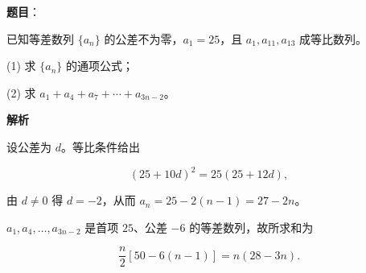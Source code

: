 \begin{answer}

\textbf{题目}：

已知等差数列 $\{a_n\}$ 的公差不为零，$a_1=25$，且 $a_1,a_{11},a_{13}$ 成等比数列。

(1) 求 $\{a_n\}$ 的通项公式；

(2) 求 $a_1+a_4+a_7+\cdots+a_{3n-2}$。

\textbf{解析}


设公差为 $d$。等比条件给出

\nopagebreak[4]
\[(25+10d)^2=25(25+12d),\]

由 $d\ne0$ 得 $d=-2$，从而 $a_n=25-2(n-1)=27-2n$。


$a_1,a_4,\ldots,a_{3n-2}$ 是首项 $25$、公差 $-6$ 的等差数列，故所求和为

\nopagebreak[4]
\[\frac n2[50-6(n-1)]=n(28-3n).\]



\end{answer}
